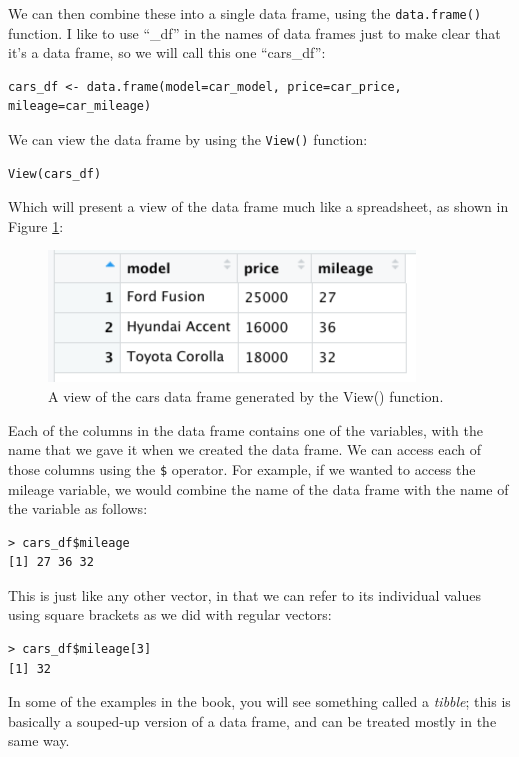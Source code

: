 \documentclass[
  12pt,
]{book}
\begin{document}
We can then combine these into a single data frame, using the \texttt{data.frame()} function. I like to use ``\_df'' in the names of data frames just to make clear that it's a data frame, so we will call this one ``cars\_df'':

\begin{verbatim}
cars_df <- data.frame(model=car_model, price=car_price, mileage=car_mileage)
\end{verbatim}

We can view the data frame by using the \texttt{View()} function:

\begin{verbatim}
View(cars_df)
\end{verbatim}

Which will present a view of the data frame much like a spreadsheet, as shown in Figure \ref{fig:carsDf}:

\begin{figure}
\centering
\includegraphics{images/cars_df.png}
\caption{\label{fig:carsDf}A view of the cars data frame generated by the View() function.}
\end{figure}

Each of the columns in the data frame contains one of the variables, with the name that we gave it when we created the data frame. We can access each of those columns using the \texttt{\$} operator. For example, if we wanted to access the mileage variable, we would combine the name of the data frame with the name of the variable as follows:

\begin{verbatim}
> cars_df$mileage
[1] 27 36 32
\end{verbatim}

This is just like any other vector, in that we can refer to its individual values using square brackets as we did with regular vectors:

\begin{verbatim}
> cars_df$mileage[3]
[1] 32
\end{verbatim}

In some of the examples in the book, you will see something called a \emph{tibble}; this is basically a souped-up version of a data frame, and can be treated mostly in the same way.
\end{document}

